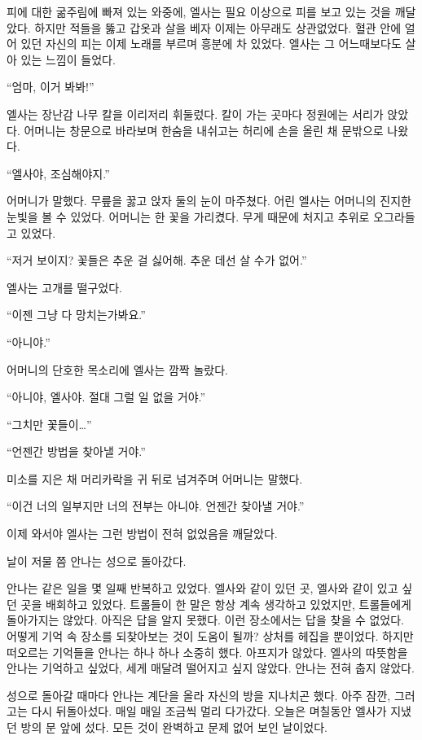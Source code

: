 피에 대한 굶주림에 빠져 있는 와중에, 엘사는 필요 이상으로 피를 보고 있는 것을 깨달았다. 하지만 적들을 뚫고 갑옷과 살을 베자 이제는 아무래도 상관없었다. 혈관 안에 얼어 있던 자신의 피는 이제 노래를 부르며 흥분에 차 있었다. 엘사는 그 어느때보다도 살아 있는 느낌이 들었다.

``엄마, 이거 봐봐!''

엘사는 장난감 나무 칼을 이리저리 휘둘렀다. 칼이 가는 곳마다 정원에는 서리가 앉았다. 어머니는 창문으로 바라보며 한숨을 내쉬고는 허리에 손을 올린 채 문밖으로 나왔다.

``엘사야, 조심해야지.''

어머니가 말했다. 무릎을 꿇고 앉자 둘의 눈이 마주쳤다. 어린 엘사는 어머니의 진지한 눈빛을 볼 수 있었다. 어머니는 한 꽃을 가리켰다. 무게 때문에 처지고 추위로 오그라들고 있었다.

``저거 보이지? 꽃들은 추운 걸 싫어해. 추운 데선 살 수가 없어.''

엘사는 고개를 떨구었다.

``이젠 그냥 다 망치는가봐요.''

``아니야.''

어머니의 단호한 목소리에 엘사는 깜짝 놀랐다.

``아니야, 엘사야. 절대 그럴 일 없을 거야.''

``그치만 꽃들이\ldots''

``언젠간 방법을 찾아낼 거야.''

미소를 지은 채 머리카락을 귀 뒤로 넘겨주며 어머니는 말했다.

``이건 너의 일부지만 너의 전부는 아니야. 언젠간 찾아낼 거야.''

이제 와서야 엘사는 그런 방법이 전혀 없었음을 깨달았다.

\textbreak

날이 저물 쯤 안나는 성으로 돌아갔다.

안나는 같은 일을 몇 일째 반복하고 있었다. 엘사와 같이 있던 곳, 엘사와 같이 있고 싶던 곳을 배회하고 있었다. 트롤들이 한 말은 항상 계속 생각하고 있었지만, 트롤들에게 돌아가지는 않았다. 아직은 답을 알지 못했다. 이런 장소에서는 답을 찾을 수 없었다. 어떻게 기억 속 장소를 되찾아보는 것이 도움이 될까? 상처를 헤집을 뿐이었다. 하지만 떠오르는 기억들을 안나는 하나 하나 소중히 했다. 아프지가 않았다. 엘사의 따뜻함을 안나는 기억하고 싶었다, 세게 매달려 떨어지고 싶지 않았다. 안나는 전혀 춥지 않았다.

성으로 돌아갈 때마다 안나는 계단을 올라 자신의 방을 지나치곤 했다. 아주 잠깐, 그러고는 다시 뒤돌아섰다. 매일 매일 조금씩 멀리 다가갔다. 오늘은 며칠동안 엘사가 지냈던 방의 문 앞에 섰다. 모든 것이 완벽하고 문제 없어 보인 날이었다.

